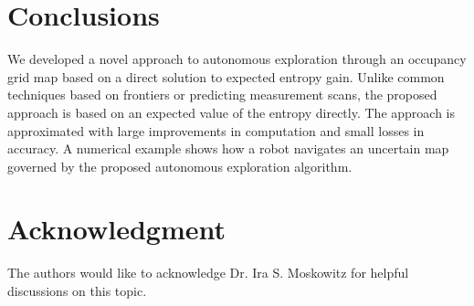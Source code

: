\documentclass[letterpaper, 10pt, conference]{ieeeconf}
\begin{document}
\section{Conclusions}

We developed a novel approach to autonomous exploration through an occupancy grid map based on a direct solution to expected entropy gain. Unlike common techniques based on frontiers or predicting measurement scans, the proposed approach is based on an expected value of the entropy directly. The approach is approximated with large improvements in computation and small losses in accuracy. A numerical example shows how a robot navigates an uncertain map governed by the proposed autonomous exploration algorithm.


\section*{Acknowledgment}
The authors would like to acknowledge Dr. Ira S. Moskowitz for helpful discussions on this topic.







%
%
%
%


%
%
%
%
\end{document}

